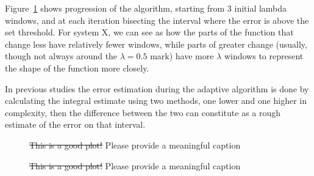 Figure~\ref{fig:adapconv}   shows progression of the
algorithm, starting from 3 initial lambda windows, and at each iteration
bisecting the interval where the error is above the set threshold. For system X,
we can see as how the parts of the function that change less have relatively
fewer windows, while parts of greater change (usually, though not always around
the $\lambda=0.5$ mark) have more $\lambda$ windows to represent the shape of
the function more closely.

 In previous studies \cite{} the
error estimation during the adaptive algorithm is done by calculating the
integral estimate using two methods, one lower and one higher in complexity,
then the difference between the two can constitute as a rough estimate of the
error on that interval.

\begin{figure}
  
  \caption{\sout{This is a good plot!} Please provide a meaningful caption}
  \label{fig:adapconv}
\end{figure}

\begin{figure}
  
\caption{\sout{This is a good plot!} Please provide a meaningful caption}
  \label{fig:savings}
\end{figure}
